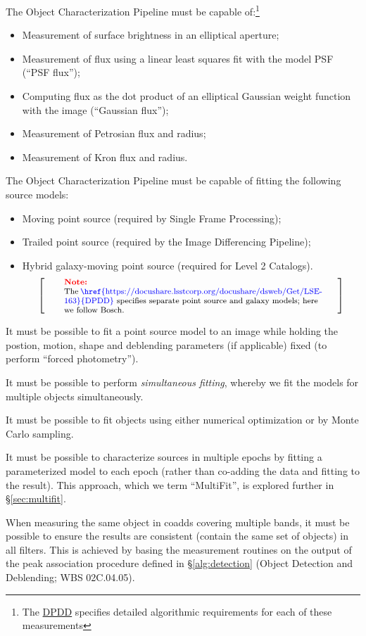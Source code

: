 \documentclass[12pt]{article}
\newcommand{\ds}[2]{{\color{blue} \href{https://docushare.lsstcorp.org/docushare/dsweb/Get/#1}{#2}}\xspace}
\newcommand{\DPDD}{\ds{LSE-163}{DPDD}}
\newcommand{\wbsDetDeblend}{WBS 02C.04.05}
\newenvironment{note}[1][Note]
{
  \begin{displaymath}
    \left[ \qquad
    \begin{minipage}[h]{.75\linewidth}
      \color{red} \footnotesize
      \textbf{#1:} \newline
      \color{black}
}
{
    \end{minipage}
    \normalsize
    \qquad \right]
  \end{displaymath}
}
\begin{document}
The Object Characterization Pipeline must be capable of:\footnote{The \DPDD{} specifies detailed algorithmic requirements for each of these measurements}
\begin{itemize}
  \item{Measurement of surface brightness in an elliptical aperture;}
  \item{Measurement of flux using a linear least squares fit with the model PSF (``PSF flux'');}
  \item{Computing flux as the dot product of an elliptical Gaussian weight function with the image (``Gaussian flux'');}
  \item{Measurement of Petrosian flux and radius;}
  \item{Measurement of Kron flux and radius.}
\end{itemize}

The Object Characterization Pipeline must be capable of fitting the following source models:
\begin{itemize}
  \item{Moving point source (required by Single Frame Processing);}
  \item{Trailed point source (required by the Image Differencing Pipeline);}
  \item{Hybrid galaxy-moving point source (required for Level 2 Catalogs).
    \begin{note}
    The \DPDD{} specifies separate point source and galaxy models; here we follow Bosch.
    \end{note}
  }
\end{itemize}

It must be possible to fit a point source model to an image while holding the postion, motion, shape and deblending parameters (if applicable) fixed (to perform ``forced photometry'').

It must be possible to perform \textit{simultaneous fitting}, whereby we fit the models for multiple objects simultaneously.

It must be possible to fit objects using either numerical optimization or by Monte Carlo sampling.

It must be possible to characterize sources in multiple epochs by fitting a parameterized model to each epoch (rather than co-adding the data and fitting to the result). This approach, which we term ``MultiFit'', is explored further in \S\ref{sec:multifit}.

When measuring the same object in coadds covering multiple bands, it must be possible to ensure the results are consistent (contain the same set of objects) in all filters. This is achieved by basing the measurement routines on the output of the peak association procedure defined in \S\ref{alg:detection} (Object Detection and Deblending; \wbsDetDeblend{}).
\end{document}
